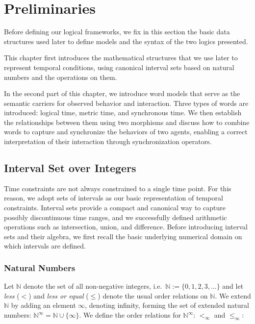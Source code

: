 \chapter{Preliminaries}\label{chapter:preliminaries}
Before defining our logical frameworks, we fix in this section the basic data structures used later to define models and the syntax of the two logics presented.

This chapter first introduces the mathematical structures that we use later to represent temporal conditions, using canonical interval sets based on natural numbers and the operations on them.

In the second part of this chapter, we introduce word models that serve as the semantic carriers for observed behavior and interaction. Three types of words are introduced: logical time, metric time, and synchronous time. We then establish the relationships between them using two morphisms and discuss how to combine words to capture and synchronize the behaviors of two agents, enabling a correct interpretation of their interaction through synchronization operators.

\section{Interval Set over Integers}
Time constraints are not always constrained to a single time point.  For this reason, we adopt sets of intervals as our basic representation of temporal constraints. Interval sets provide a compact and canonical way to capture possibly discontinuous time ranges, and we successfully defined arithmetic operations such as intersection, union, and difference. Before introducing interval sets and their algebra, we first recall the basic underlying numerical domain on which intervals are defined.
\subsection{Natural Numbers}

Let  $\mathbb{N}$ denote the set of all non-negative integers, i.e.\ \( \mathbb{N}:= \{ 0, 1, 2, 3, \dots \} \) and let \emph{less} ($<$) and  \emph{less or equal} ($\leq$) denote the usual order relations on $\mathbb{N}$.
%
We extend \(\mathbb{N}\) by adding an element \(\infty\), denoting infinity, forming the set of extended  natural numbers: %
\( \mathbb{N}^\infty = \mathbb{N} \cup \{\infty\} \).
We define  the order relations for  $\mathbb{N}^\infty$: $<_\infty$ and  $\leq_\infty$:

